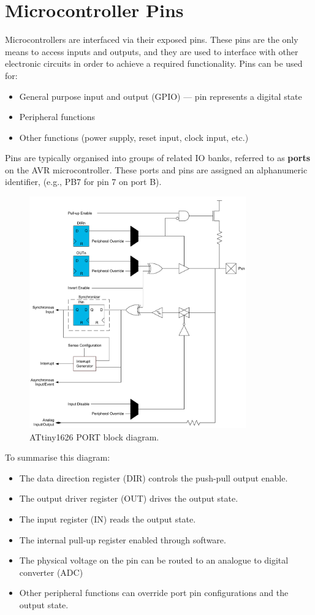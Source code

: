\documentclass{report}
\begin{document}
\section{Microcontroller Pins}
Microcontrollers are interfaced via their exposed pins.
These pins are the only means to access inputs and outputs, and
they are used to interface with other electronic circuits in order to achieve a required functionality.
Pins can be used for:
\begin{itemize}
    \item General purpose input and output (GPIO) --- pin represents a digital state
    \item Peripheral functions
    \item Other functions (power supply, reset input, clock input, etc.)
\end{itemize}
Pins are typically organised into groups of related IO banks,
referred to as \textbf{ports} on the AVR microcontroller.
These ports and pins are assigned an alphanumeric identifier, (e.g., PB7 for pin 7 on port B).
\begin{figure}[H]
    \centering
    \includegraphics[height = 10cm, keepaspectratio = true]{figures/PORT_block_diagram.pdf}
    \caption{ATtiny1626 PORT block diagram.} %
\end{figure}
To summarise this diagram:
\begin{itemize}
    \item The data direction register (DIR) controls the push-pull output enable.
    \item The output driver register (OUT) drives the output state.
    \item The input register (IN) reads the output state.
    \item The internal pull-up register enabled through software.
    \item The physical voltage on the pin can be routed to an analogue to digital converter (ADC)
    \item Other peripheral functions can override port pin configurations and the output state.
\end{itemize}
\end{document}
